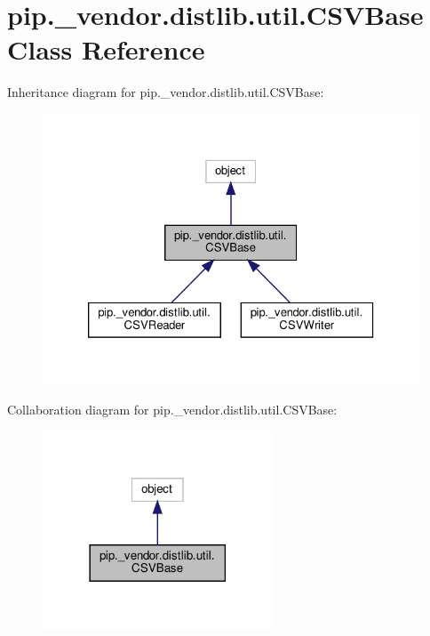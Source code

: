 \hypertarget{classpip_1_1__vendor_1_1distlib_1_1util_1_1CSVBase}{}\section{pip.\+\_\+vendor.\+distlib.\+util.\+C\+S\+V\+Base Class Reference}
\label{classpip_1_1__vendor_1_1distlib_1_1util_1_1CSVBase}


Inheritance diagram for pip.\+\_\+vendor.\+distlib.\+util.\+C\+S\+V\+Base\+:
\nopagebreak
\begin{figure}[H]
\begin{center}
\leavevmode
\includegraphics[width=326pt]{classpip_1_1__vendor_1_1distlib_1_1util_1_1CSVBase__inherit__graph}
\end{center}
\end{figure}


Collaboration diagram for pip.\+\_\+vendor.\+distlib.\+util.\+C\+S\+V\+Base\+:
\nopagebreak
\begin{figure}[H]
\begin{center}
\leavevmode
\includegraphics[width=194pt]{classpip_1_1__vendor_1_1distlib_1_1util_1_1CSVBase__coll__graph}
\end{center}
\end{figure}
